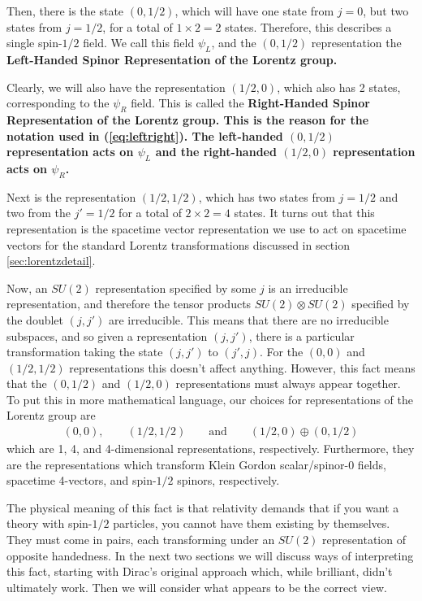 \documentclass[12pt,epsf]{article}
\def\nolabel{\nonumber }
\def\nolabel{\nonumber }
\begin{document}
Then, there is the state $(0,1/2)$, which will have one state from
$j=0$, but two states from $j=1/2$, for a total of $1\times 2 = 2$
states.  Therefore, this describes a single spin-$1/2$ field.  We call
this field $\psi_L$, and the $(0,1/2)$ representation the \bf Left-Handed
Spinor Representation \rm of the Lorentz group.	

Clearly, we will also have the representation $(1/2,0)$, which also has
2 states, corresponding to the $\psi_R$ field.  This is called the \bf
Right-Handed Spinor Representation \rm of the Lorentz group.  This is
the reason for the notation used in (\ref{eq:leftright}).  The left-handed
$(0,1/2)$ representation acts on $\psi_L$ and the right-handed
$(1/2,0)$ representation acts on $\psi_R$.  

Next is the representation $(1/2,1/2)$, which has two states from
$j=1/2$ and two from the $j'=1/2$ for a total of $2\times 2 = 4$
states.  It turns out that this representation is the spacetime vector
representation we use to act on spacetime vectors for the standard
Lorentz transformations discussed in section \ref{sec:lorentzdetail}.  

Now, an $SU(2)$ representation specified by some $j$ is an irreducible
representation, and therefore the tensor products $SU(2)\otimes SU(2)$
specified by the doublet $(j,j')$ are irreducible.  This means that
there are no irreducible subspaces, and so given a representation
$(j,j')$, there is a particular transformation taking the state
$(j,j')$ to $(j',j)$.  For the $(0,0)$ and $(1/2,1/2)$ representations
this doesn't affect anything.  However, this fact means that the
$(0,1/2)$ and $(1/2,0)$ representations must always appear together. 
To put this in more mathematical language, our choices for
representations of the Lorentz group are 
\begin{eqnarray}
(0,0), \qquad (1/2,1/2) \qquad \mbox{and} \qquad (1/2,0)\oplus (0,1/2)\nolabel
\end{eqnarray}
which are 1, 4, and 4-dimensional representations, respectively. 
Furthermore, they are the representations which transform Klein Gordon
scalar/spinor-0 fields, spacetime 4-vectors, and  spin-$1/2$
spinors, respectively.	

The physical meaning of this fact is that relativity demands that if
you want a theory with spin-$1/2$ particles, you cannot have them
existing by themselves.  They must come in pairs, each transforming
under an $SU(2)$ representation of opposite handedness.  In the next
two sections we will discuss ways of interpreting this fact, starting
with Dirac's original approach which, while brilliant, didn't
ultimately work.  Then we will consider what appears to be the correct
view.  
\end{document}
